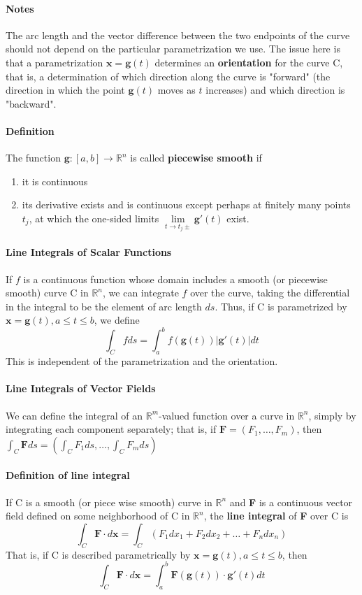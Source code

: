 \documentclass[11pt]{article}
\newcommand{\tb}[1]{\textbf{#1}}
\newcommand{\real}[0]{\mathbb{R}}
\newcommand{\vx}[0]{\tb{x}}
\begin{document}
\paragraph{Notes} The arc length and the vector difference between the two endpoints of the curve should not depend on the particular parametrization we use. The issue here is that a parametrization $\vx = \tb{g}(t)$ determines an \tb{orientation} for the curve C, that is, a determination of which direction along the curve is "forward" (the direction in which the point $\tb{g}(t)$ moves as $t$ increases) and which direction is "backward". 
\paragraph{Definition} The function $\tb{g}: [a,b] \rightarrow \real^n$ is called \tb{piecewise smooth} if
\begin{enumerate}
    \item it is continuous
    \item its derivative exists and is continuous except perhaps at finitely many points $t_j$, at which the one-sided limits $\underset{t\rightarrow t_j\pm}{\lim}\tb{g}'(t)$ exist. 
\end{enumerate}
\paragraph{Line Integrals of Scalar Functions} 
If $f$ is a continuous function whose domain includes a smooth (or piecewise smooth) curve C in $\real^n$, we can integrate $f$ over the curve, taking the differential in the integral to be the element of arc length $ds$. Thus, if C is parametrized by $\vx = \tb{g}(t), a\leq t \leq b$, we define
$$\int_C f ds = \int_a^b f(\tb{g}(t))|\tb{g}'(t)|dt$$ This is independent of the parametrization and the orientation.
\paragraph{Line Integrals of Vector Fields} We can define the integral of an $\real^m$-valued function over a curve in $\real^n$, simply by integrating each component separately; that is, if $\tb{F} = (F_1,\hdots,F_m)$, then $\int_C\tb{F}ds = (\int_C F_1ds,\hdots,\int_C F_mds)$
\paragraph{Definition of line integral} If C is a smooth (or piece wise smooth) curve in $\real^n$ and \tb{F} is a continuous vector field defined on some neighborhood of C in $\real^n$, the \tb{line integral} of \tb{F} over C is
$$\int_C \tb{F} \cdot d\vx = \int_C (F_1dx_1+F_2dx_2+\hdots+F_ndx_n)$$
That is, if C is described parametrically by $\vx = \tb{g}(t), a\leq t\leq b$, then
$$\int_C \tb{F} \cdot d\vx = \int_a^b\tb{F}(\tb{g}(t))\cdot \tb{g}'(t)dt$$
\end{document}
